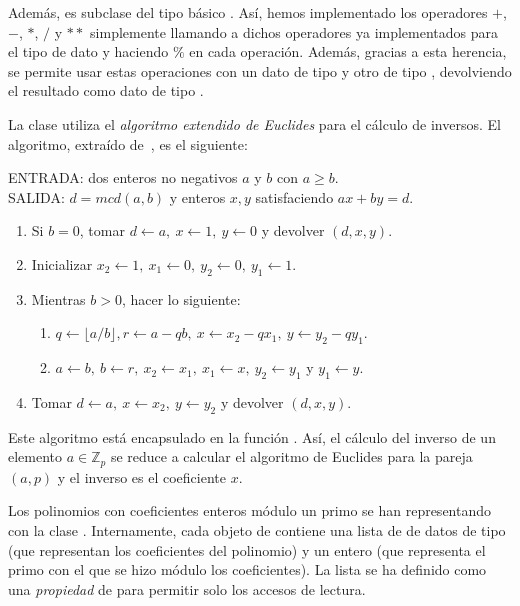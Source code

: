 Además,  es subclase del tipo básico . Así, hemos implementado los operadores $+$, $-$, $*$, $/$ y $**$ simplemente llamando a dichos operadores ya implementados para el tipo de dato  y haciendo $\%$ en cada operación. Además, gracias a esta herencia, se permite usar estas operaciones con un dato de tipo  y otro de tipo , devolviendo el resultado como dato de tipo .

La clase  utiliza el \emph{algoritmo extendido de Euclides} para el cálculo de inversos. El algoritmo, extraído de~\cite{Menezes:1996}, es el siguiente:
\begin{algoritmo2}
    ENTRADA: dos enteros no negativos $a$ y $b$ con $a \ge b$. \\
    SALIDA: $d = mcd(a, b)$ y enteros $x, y$ satisfaciendo $a x + b y = d$.
    \begin{enumerate}
        \item Si $b = 0$, tomar $d \leftarrow a, \ x \leftarrow 1, \ y \leftarrow 0$ y devolver $(d, x, y)$.
        \item Inicializar $x_2 \leftarrow 1, \ x_1 \leftarrow 0, \ y_2 \leftarrow 0,\ y_1 \leftarrow 1$.
        \item Mientras $b > 0$, hacer lo siguiente:
        \begin{enumerate}
            \item $q \leftarrow \lfloor a/b \rfloor, r \leftarrow a - q b, \ x \leftarrow x_2 - q x_1, \ y \leftarrow y_2 - q y_1$.
            \item $a \leftarrow b, \ b \leftarrow r, \ x_2 \leftarrow x_1, \ x_1 \leftarrow x, \ y_2 \leftarrow y_1$ y $y_1 \leftarrow y$.
        \end{enumerate}
        \item Tomar $d \leftarrow a, \ x \leftarrow x_2, \ y \leftarrow y_2$ y devolver $(d, x, y)$.
    \end{enumerate}
\end{algoritmo2}
Este algoritmo está encapsulado en la función . Así, el cálculo del inverso de un elemento $a \in \mathbb{Z}_p$ se reduce a calcular el algoritmo de Euclides para la pareja $(a, p)$ y el inverso es el coeficiente $x$.

Los polinomios con coeficientes enteros módulo un primo se han representando con la clase . Internamente, cada objeto de  contiene una lista de  de datos de tipo  (que representan los coeficientes del polinomio) y un entero (que representa el primo con el que se hizo módulo los coeficientes). La lista se ha definido como una \emph{propiedad} de  para permitir solo los accesos de lectura.

